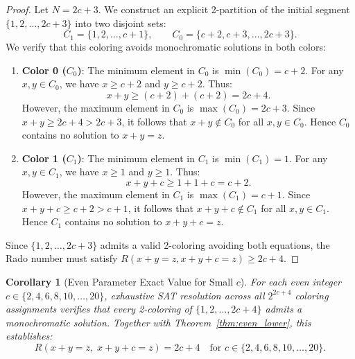 \documentclass[11pt]{article}
\newtheorem{corollary}{Corollary}
\theoremstyle{definition}
\begin{document}
\begin{proof}
Let $N = 2c + 3$. We construct an explicit 2-partition of the initial segment $\{1, 2, \dots, 2c + 3\}$ into two disjoint sets:
\begin{equation}
    C_1 = \{1, 2, \dots, c+1\}, \qquad C_0 = \{c+2, c+3, \dots, 2c+3\}.
\end{equation}
We verify that this coloring avoids monochromatic solutions in both colors:

\begin{enumerate}
    \item \textbf{Color 0 ($C_0$)}: The minimum element in $C_0$ is $\min(C_0) = c+2$. For any $x, y \in C_0$, we have $x \ge c+2$ and $y \ge c+2$. Thus:
    \begin{equation}
        x + y \ge (c+2) + (c+2) = 2c + 4.
    \end{equation}
    However, the maximum element in $C_0$ is $\max(C_0) = 2c + 3$. Since $x + y \ge 2c + 4 > 2c + 3$, it follows that $x + y \notin C_0$ for all $x, y \in C_0$. Hence $C_0$ contains no solution to $x + y = z$.
    
    \item \textbf{Color 1 ($C_1$)}: The minimum element in $C_1$ is $\min(C_1) = 1$. For any $x, y \in C_1$, we have $x \ge 1$ and $y \ge 1$. Thus:
    \begin{equation}
        x + y + c \ge 1 + 1 + c = c + 2.
    \end{equation}
    However, the maximum element in $C_1$ is $\max(C_1) = c + 1$. Since $x + y + c \ge c + 2 > c + 1$, it follows that $x + y + c \notin C_1$ for all $x, y \in C_1$. Hence $C_1$ contains no solution to $x + y + c = z$.
\end{enumerate}

Since $\{1, 2, \dots, 2c+3\}$ admits a valid 2-coloring avoiding both equations, the Rado number must satisfy $R(x+y=z, x+y+c=z) \ge 2c + 4$.
\end{proof}

\begin{corollary}[Even Parameter Exact Value for Small $c$]
For each even integer $c \in \{2, 4, 6, 8, 10, \dots, 20\}$, exhaustive SAT resolution across all $2^{2c+4}$ coloring assignments verifies that every 2-coloring of $\{1, 2, \dots, 2c+4\}$ admits a monochromatic solution. Together with Theorem~\ref{thm:even_lower}, this establishes:
\begin{equation}
    R(x+y=z, \; x+y+c=z) = 2c + 4 \quad \text{for } c \in \{2, 4, 6, 8, 10, \dots, 20\}.
\end{equation}
\end{corollary}
\end{document}
